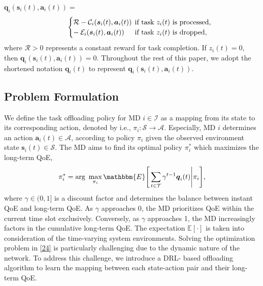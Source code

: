 \documentclass[10pt, journal,letterpaper]{IEEEtran}
\begin{document}
$\boldsymbol{q}_i(\boldsymbol{s}_i(t),\boldsymbol{a}_i(t)) =$
\begin{alignat}{1}
	\hspace*{8mm}
	\begin{cases} 
		\mathcal{R} - \mathcal{C}_i(\boldsymbol{s}_i(t),\boldsymbol{a}_i(t)) & \hspace*{-2mm} \text{if task $z_i(t)$ is processed,} \\
		- \hspace*{0.8mm} \mathcal{E}_i(\boldsymbol{s}_i(t),\boldsymbol{a}_i(t)) &	\hspace*{-2mm} \text{if task $z_i(t)$ is dropped,}
	\end{cases}
	\label{26}  
\end{alignat}
where $\mathcal{R} > 0$ represents a constant reward for task completion. If $z_i(t) = 0$, then $\boldsymbol{q}_i(\boldsymbol{s}_i(t), \boldsymbol{a}_i(t)) = 0$. Throughout the rest of this paper, we adopt the shortened notation $\boldsymbol{q}_i(t)$ to represent $\boldsymbol{q}_i(\boldsymbol{s}_i(t), \boldsymbol{a}_i(t))$.






\subsection{Problem Formulation}
We define the task offloading policy for MD $i \in \mathcal{I}$ as a mapping from its state to its corresponding action, denoted by i.e., $\pi_i : \mathcal{S} \rightarrow \mathcal{A}$. Especially, MD $i$ determines an action $\boldsymbol{a}_i(t) \in \mathcal{A}$, according to policy $\pi_i$ given the observed environment state $\boldsymbol{s}_i(t) \in \mathcal{S}$. The MD aims to find its optimal policy $\pi_i^*$ which maximizes the long-term QoE,
\begin{alignat}{1}
	\pi_i^* = \text{arg}\,\,  \max\limits_{\pi_i}  \mathbbm{E} \Bigg[ \sum\limits_{t \in \mathcal{T}}  \gamma^{t-1}\boldsymbol{q}_i(t) \Bigg| \pi_i \Bigg],
	\label{24}  
\end{alignat}
where $\gamma \in (0,1]$ is a discount factor and determines the balance between instant QoE and long-term QoE. As $\gamma$ approaches 0, the MD prioritizes QoE within the current time slot exclusively. Conversely, as $\gamma$ approaches 1, the MD increasingly factors in the cumulative long-term QoE. The expectation $\mathbb{E}[\cdot]$ is taken into consideration of the time-varying system environments. Solving the optimization problem in \eqref{24} is particularly challenging due to the dynamic nature of the network. To address this challenge, we introduce a DRL- based offloading algorithm to learn the mapping between each state-action pair and their long-term QoE.
\end{document}
